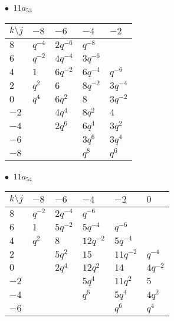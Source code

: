 \begin{minipage}{\linewidth}
$\bullet\ $ $11a_{53}$ \vspace{0.5em} \\
\begin{tabular}{l|llll}
$k \setminus j$ & $-8$ & $-6$ & $-4$ & $-2$ \\
\hline
$8$ & $q^{-4}$ & $2q^{-6}$ & $q^{-8}$ &  \\
$6$ & $q^{-2}$ & $4q^{-4}$ & $3q^{-6}$ &  \\
$4$ & $1$ & $6q^{-2}$ & $6q^{-4}$ & $q^{-6}$ \\
$2$ & $q^{2}$ & $6$ & $8q^{-2}$ & $3q^{-4}$ \\
$0$ & $q^{4}$ & $6q^{2}$ & $8$ & $3q^{-2}$ \\
$-2$ &  & $4q^{4}$ & $8q^{2}$ & $4$ \\
$-4$ &  & $2q^{6}$ & $6q^{4}$ & $3q^{2}$ \\
$-6$ &  &  & $3q^{6}$ & $3q^{4}$ \\
$-8$ &  &  & $q^{8}$ & $q^{6}$ \\
\end{tabular}
\vspace{2em}
\end{minipage}
%
\begin{minipage}{\linewidth}
$\bullet\ $ $11a_{54}$ \vspace{0.5em} \\
\begin{tabular}{l|lllll}
$k \setminus j$ & $-8$ & $-6$ & $-4$ & $-2$ & $0$ \\
\hline
$8$ & $q^{-2}$ & $2q^{-4}$ & $q^{-6}$ &  &  \\
$6$ & $1$ & $5q^{-2}$ & $5q^{-4}$ & $q^{-6}$ &  \\
$4$ & $q^{2}$ & $8$ & $12q^{-2}$ & $5q^{-4}$ &  \\
$2$ &  & $5q^{2}$ & $15$ & $11q^{-2}$ & $q^{-4}$ \\
$0$ &  & $2q^{4}$ & $12q^{2}$ & $14$ & $4q^{-2}$ \\
$-2$ &  &  & $5q^{4}$ & $11q^{2}$ & $5$ \\
$-4$ &  &  & $q^{6}$ & $5q^{4}$ & $4q^{2}$ \\
$-6$ &  &  &  & $q^{6}$ & $q^{4}$ \\
\end{tabular}
\vspace{2em}
\end{minipage}
%
